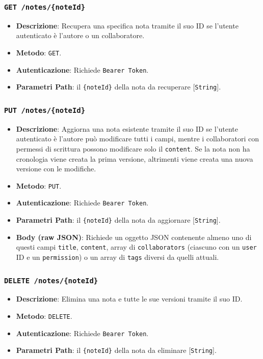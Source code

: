 \documentclass[11pt]{article}
\begin{document}
\subsubsection{\texttt{GET /notes/\{noteId\}}}
\begin{itemize}
    \item \textbf{Descrizione}: Recupera una specifica nota tramite il suo ID se l'utente autenticato è l'autore o un collaboratore.
    \item \textbf{Metodo}: \texttt{GET}.
    \item \textbf{Autenticazione}: Richiede \texttt{Bearer Token}.
    \item \textbf{Parametri Path}: il \texttt{\{noteId\}} della nota da recuperare [\texttt{String}].
\end{itemize}

\subsubsection{\texttt{PUT /notes/\{noteId\}}}
\begin{itemize}
    \item \textbf{Descrizione}: Aggiorna una nota esistente tramite il suo ID se l'utente autenticato è l'autore può modificare tutti i campi, mentre i collaboratori con permessi di scrittura possono modificare solo il \texttt{content}. Se la nota non ha cronologia viene creata la prima versione, altrimenti viene creata una nuova versione con le modifiche.
    \item \textbf{Metodo}: \texttt{PUT}.
    \item \textbf{Autenticazione}: Richiede \texttt{Bearer Token}.
    \item \textbf{Parametri Path}: il \texttt{\{noteId\}} della nota da aggiornare [\texttt{String}].
    \item \textbf{Body (raw JSON)}: Richiede un oggetto JSON contenente almeno uno di questi campi \texttt{title}, \texttt{content}, array di \texttt{collaborators} (ciascuno con un \texttt{user} ID e un \texttt{permission}) o un array di \texttt{tags} diversi da quelli attuali.
\end{itemize}

\subsubsection{\texttt{DELETE /notes/\{noteId\}}}
\begin{itemize}
    \item \textbf{Descrizione}: Elimina una nota e tutte le sue versioni tramite il suo ID.
    \item \textbf{Metodo}: \texttt{DELETE}.
    \item \textbf{Autenticazione}: Richiede \texttt{Bearer Token}.
    \item \textbf{Parametri Path}: il \texttt{\{noteId\}} della nota da eliminare [\texttt{String}].
\end{itemize}
\end{document}
